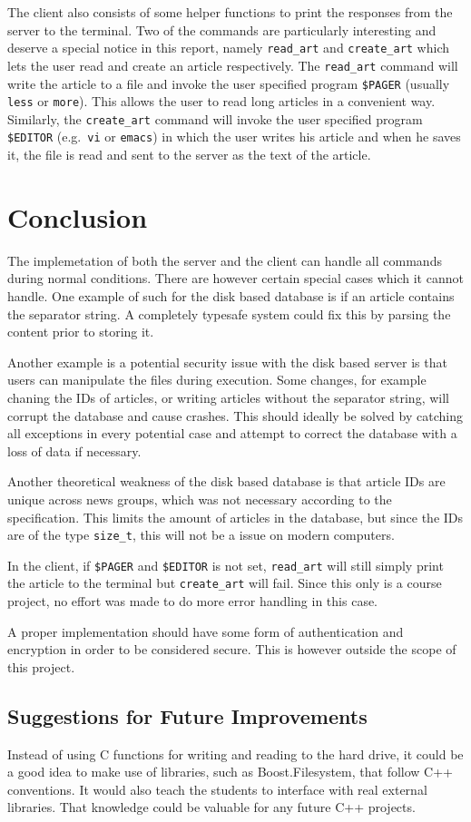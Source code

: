 \documentclass{acmsiggraph}               %
\begin{document}
The client also consists of some helper functions to print the responses from
the server to the terminal. Two of the commands are particularly interesting
and deserve a special notice in this report, namely \verb|read_art| and
\verb|create_art| which lets the user read and create an article respectively.
The \verb|read_art| command will write the article to a file and invoke the
user specified program \verb|$PAGER| (usually \verb|less| or \verb|more|). This
allows the user to read long articles in a convenient way. Similarly, the
\verb|create_art| command will invoke the user specified program \verb|$EDITOR|
(e.g.\ \verb|vi| or \verb|emacs|) in which the user writes his article and when
he saves it, the file is read and sent to the server as the text of the
article.



\section{Conclusion}
\label{sec:concl}
The implemetation of both the server and the client can handle all commands during
normal conditions. There are however certain special cases which it cannot handle. One
example of such for the disk based database is if an article contains the separator
string. A completely typesafe system could fix this by parsing the content prior to
storing it. 

Another example is a potential security issue with the disk based server
is that users can manipulate the files during execution. Some changes, for example 
chaning the IDs of articles, or writing articles without the separator string, will
corrupt the database and cause crashes. This should ideally be solved by catching
all exceptions in every potential case and attempt to correct the database with a
loss of data if necessary. 

Another theoretical weakness of the disk based database is that article IDs are unique
across news groups, which was not necessary according to the specification. This
limits the amount of articles in the database, but since the IDs are of
the type \texttt{size\_t}, this will not be a issue on modern computers.

In the client, if \verb|$PAGER| and \verb|$EDITOR| is not set, \verb|read_art| will still
simply print the article to the terminal but \verb|create_art| will fail. Since
this only is a course project, no effort was made to do more error handling in
this case.

A proper implementation should have some form of authentication and encryption 
in order to be considered secure. This is however outside the scope of this project.

\subsection{Suggestions for Future Improvements}
Instead of using C functions for writing and reading to the hard drive, it could
be a good idea to make use of libraries, such as Boost.Filesystem, that follow C++ 
conventions. It would also teach the students to interface with real external libraries. 
That knowledge could be valuable for any future C++ projects.
\end{document}
